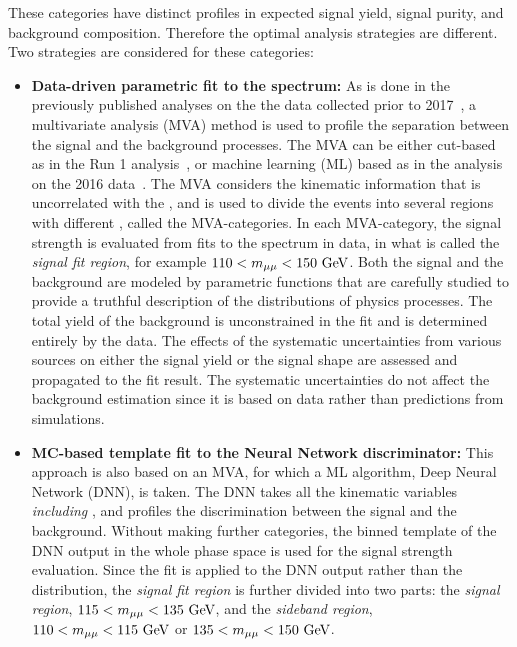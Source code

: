 These categories have distinct profiles in expected signal yield, signal purity, and background composition.
Therefore the optimal analysis strategies are different.
Two strategies are considered for these categories:

\begin{itemize}
    \item \textbf{Data-driven parametric fit to the \mmm spectrum:} 
          As is done in the previously published analyses on the the data collected prior to 2017~\cite{2015184, PhysRevLett.122.021801},  
          a multivariate analysis (MVA) method is used to profile the separation between the signal and the background processes. 
          The MVA can be either cut-based as in the Run 1 analysis~\cite{2015184}, or machine learning (ML) based as in the analysis on the 2016 data~\cite{PhysRevLett.122.021801}.
          The MVA considers the kinematic information that is uncorrelated with the \mmm, and is used to divide the events into several regions 
          with different \SoB, called the MVA-categories. 
          In each MVA-category, the signal strength is evaluated from fits to the \mmm spectrum in data, in what is called the \textit{signal fit region}, for example $110<m_{\mu\mu}<150~\mbox{GeV}$.
          Both the signal and the background are modeled by parametric functions that are carefully studied to provide a truthful description of the distributions of physics processes. 
          The total yield of the background is unconstrained in the fit and is determined entirely by the data.
          The effects of the systematic uncertainties from various sources on either the signal yield or the signal shape are assessed and propagated to the fit result. 
          The systematic uncertainties do not affect the background estimation since it is based on data rather than predictions from simulations.
    \item \textbf{MC-based template fit to the Neural Network discriminator:}
          This approach is also based on an MVA, for which a ML algorithm, Deep Neural Network (DNN), is taken.
          The DNN takes all the kinematic variables \textit{including \mmm}, and profiles the discrimination between the signal and the background.
          Without making further categories, the binned template of the DNN output in the whole phase space is used for the signal strength evaluation.
          Since the fit is applied to the DNN output rather than the \mmm distribution, the \textit{signal fit region} is further divided into two parts:
          the \textit{signal region}, $115<m_{\mu\mu}<135 ~\mbox{GeV}$, and the \textit{sideband region}, $110<m_{\mu\mu}<115 ~\mbox{GeV}$ or $135<m_{\mu\mu}<150 ~\mbox{GeV}$.

\end{itemize}
